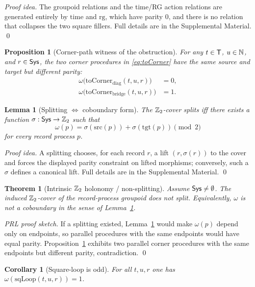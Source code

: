 \documentclass[aps,prl,reprint,floatfix]{revtex4-2}
\theoremstyle{plain}
\newtheorem{theorem}{Theorem}
\newtheorem{proposition}{Proposition}
\newtheorem{lemma}{Lemma}
\newtheorem{corollary}{Corollary}
\theoremstyle{definition}
\begin{document}
\noindent\emph{Proof idea.}
The groupoid relations and the time/RG action relations are generated entirely by $\mathrm{time}$ and $\mathrm{rg}$,
which have parity $0$, and there is no relation that collapses the two square fillers. Full details are in the Supplemental Material. \qed

\begin{proposition}[Corner-path witness of the obstruction]
\label{prop:corner-witness}
For any $t\in\mathsf{T}$, $u\in\mathbb{N}$, and $r\in\mathsf{Sys}$, the two corner procedures in \eqref{eq:toCorner} have the same source and target but different parity:
\[
\begin{aligned}
\omega\big(\mathrm{toCorner}_{\mathrm{diag}}(t,u,r)\big)&=0,\\
\omega\big(\mathrm{toCorner}_{\mathrm{bridge}}(t,u,r)\big)&=1.
\end{aligned}
\]
\end{proposition}

\begin{lemma}[Splitting $\Leftrightarrow$ coboundary form]
\label{lem:split-cob-prl}
The $\mathbb{Z}_2$-cover splits iff there exists a function $\sigma:\mathsf{Sys}\to\mathbb{Z}_2$ such that
\[
\omega(p)=\sigma(\mathrm{src}(p))+\sigma(\mathrm{tgt}(p)) \pmod 2
\]
for every record process $p$.
\end{lemma}

\noindent\emph{Proof idea.}
A splitting chooses, for each record $r$, a lift $(r,\sigma(r))$ to the cover and forces the displayed parity constraint on lifted morphisms;
conversely, such a $\sigma$ defines a canonical lift. Full details are in the Supplemental Material. \qed

\begin{theorem}[Intrinsic $\mathbb{Z}_2$ holonomy / non-splitting]
\label{thm:non-splitting-prl}
Assume $\mathsf{Sys}\neq\emptyset$. The induced $\mathbb{Z}_2$-cover of the record-process groupoid does not split.
Equivalently, $\omega$ is not a coboundary in the sense of Lemma~\ref{lem:split-cob-prl}.
\end{theorem}

\noindent\emph{PRL proof sketch.}
If a splitting existed, Lemma~\ref{lem:split-cob-prl} would make $\omega(p)$ depend only on endpoints, so parallel procedures with the same endpoints would have equal parity.
Proposition~\ref{prop:corner-witness} exhibits two parallel corner procedures with the same endpoints but different parity, contradiction. \qed

\begin{corollary}[Square-loop is odd]
\label{cor:sqloop-odd}
For all $t,u,r$ one has $\omega(\mathrm{sqLoop}(t,u,r))=1$.
\end{corollary}
\end{document}
